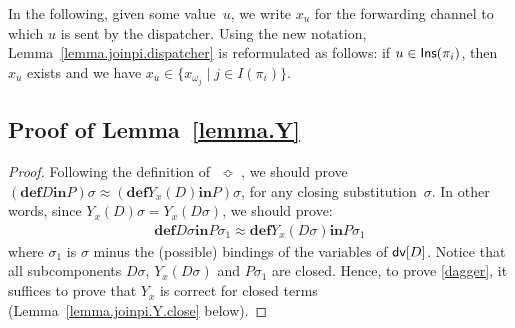 \documentclass{LMCS}
\newcommand{\forget}[1]{}
\newcommand{\resetequationcounter}{\setcounter{equation}{0}}
\newcommand{\pt}{\pi}
\newcommand{\ptbis}{\omega}
\newcommand{\ins}[1]{{\sf Ins}(#1)}
\newcommand{\kwd}[1]{\ensuremath{\mathbf{#1}}}
\newcommand{\prefix}[1]{\mathopen{}\mathrel{\kwd {#1}}}
\newcommand{\infix}[1]{\mathrel{\kwd {#1}}}
\newcommand{\set}[1]{\{#1\}}
\renewcommand{\_}{\mathord{\rule[-.25ex]{1ex}{.15ex}}}
\newcommand{\define}[2]{\prefix{def} #1 \infix{in} #2}
\newcommand{\wbc}{\mathrel{\approx}}
\newcommand{\pseq}{\;\mathop{\Bumpeq}\;}
\newcommand{\preds}[1]{I(#1)}
\newcommand{\dv}[1]{\mbox{\sf dv}[#1]}
\begin{document}
In the following, given some value~$u$, we write $x_u$ for the forwarding
channel to which $u$ is sent by the dispatcher.  Using the new notation,
Lemma~\ref{lemma.joinpi.dispatcher} is reformulated as follows: if $u \in
\ins{\pt_i}$, then $x_u$ exists and we have $x_u\in\set{x_{\ptbis_j} \mid
  j\in\preds{\pt_i}}$.

\subsection{Proof of Lemma~\ref{lemma.Y}}
\label{subsec.prooflemmaY}
\forget{Now we are ready to prove Lemma~\ref{lemma.Y}.}
\resetequationcounter
\begin{proof}
  Following the
  definition of $\pseq$, we should prove ${(\define{D}{P})}{\sigma} \wbc
  {(\define{Y_x(D)}{P})}{\sigma}$, for any closing substitution~$\sigma$.
  In other words, since ${Y_x(D)}{\sigma} = Y_x({D}{\sigma})$,
  we should prove:
  \begin{align}
    \define{{D}{\sigma}}{{P}{\sigma_1}} \wbc
    \define{Y_x({D}{\sigma})}{{P}{\sigma_1}}
    \label{dagger}
  \end{align}
  where $\sigma_1$ is $\sigma$ minus the (possible) bindings of the
  variables of $\dv{D}$.
  Notice that all subcomponents ${D}{\sigma}$, $Y_x({D}{\sigma})$ and
  ${P}{\sigma_1}$ are closed. 
  Hence, to prove
  \eqref{dagger}, it suffices to prove that $Y_x$ is correct for
  closed terms (Lemma~\ref{lemma.joinpi.Y.close} below). \forget{\qed}
\end{proof}
\end{document}
